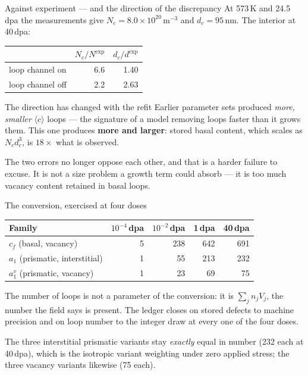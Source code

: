 \documentclass[aspectratio=169,10pt]{beamer}
\newcommand{\cloop}{$\langle c\rangle$}
\newcommand{\foot}[1]{\par\vspace{1ex}%
  \begingroup\footnotesize\raggedright #1\par\endgroup}
\begin{document}
\begin{frame}{Against experiment --- and the direction of the discrepancy}
\small
At 573\,K and 24.5\,dpa the measurements give
$N_c=8.0\times10^{20}\,\mathrm{m^{-3}}$ and $d_c=95$\,nm. The interior at
40\,dpa:
\begin{center}
\begin{tabular}{@{}lrr@{}}
\toprule
 & $N_c/N^{\exp}$ & $d_c/d^{\exp}$ \\
\midrule
loop channel on & 6.6 & 1.40 \\
loop channel off & 2.2 & 2.63 \\
\bottomrule
\end{tabular}
\end{center}
\begin{block}{The direction has changed with the refit}
Earlier parameter sets produced \emph{more, smaller} \cloop{} loops --- the
signature of a model removing loops faster than it grows them. This one
produces \textbf{more and larger}: stored basal content, which scales as
$N_cd_c^{3}$, is $18\times$ what is observed.
\end{block}
\foot{The two errors no longer oppose each other, and that is a harder failure
to excuse. It is not a size problem a growth term could absorb --- it is too
much vacancy content retained in basal loops.}
\end{frame}

\begin{frame}{The conversion, exercised at four doses}
\centering\small
\begin{tabular}{@{}lrrrr@{}}
\toprule
Family & $10^{-4}$\,dpa & $10^{-2}$\,dpa & 1\,dpa & 40\,dpa \\
\midrule
$c_f$ (basal, vacancy)          & 5 & 238 & 642 & 691 \\
$a_1$ (prismatic, interstitial) & 1 &  55 & 213 & 232 \\
$a_1^{v}$ (prismatic, vacancy)  & 1 &  23 &  69 &  75 \\
\bottomrule
\end{tabular}
\vspace{1.5ex}

The number of loops is not a parameter of the conversion: it is
$\sum_jn_jV_j$, the number the field says is present. The ledger closes on
stored defects to machine precision and on loop number to the integer draw at
every one of the four doses.
\foot{The three interstitial prismatic variants stay \emph{exactly} equal in
number (232 each at 40\,dpa), which is the isotropic variant weighting under
zero applied stress; the three vacancy variants likewise (75 each).}
\end{frame}
\end{document}
